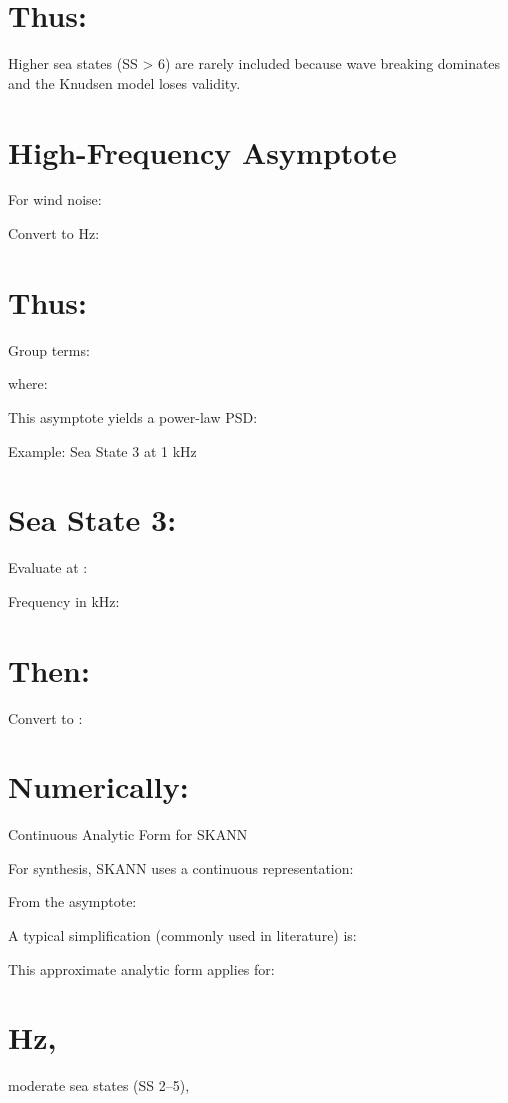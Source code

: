 \documentclass[12pt]{article}
\begin{document}
\section*{Thus:}

Higher sea states (SS > 6) are rarely included because wave breaking dominates and the Knudsen model loses validity.

\section*{High-Frequency Asymptote}
For wind noise:


Convert  to Hz:


\section*{Thus:}

Group terms:


where:


This asymptote yields a power-law PSD:


Example: Sea State 3 at 1 kHz

\section*{Sea State 3:}

Evaluate at :

Frequency in kHz:


\section*{Then:}

Convert to :


\section*{Numerically:}


Continuous Analytic Form for SKANN

For synthesis, SKANN uses a continuous representation:


From the asymptote:


A typical simplification (commonly used in literature) is:


This approximate analytic form applies for:

\section*{Hz,}
moderate sea states (SS 2–5),
\end{document}
